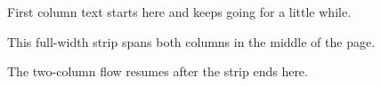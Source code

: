 \documentclass[twocolumn]{article}
\begin{document}
First column text starts here and keeps going for a little while.
\begin{strip}
This full-width strip spans both columns in the middle of the page.
\end{strip}
The two-column flow resumes after the strip ends here.
\end{document}
